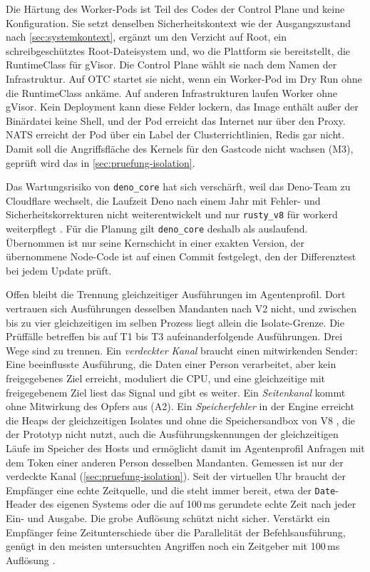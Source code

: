 Die Härtung des Worker-Pods ist Teil des Codes der Control Plane und keine Konfiguration. Sie setzt denselben
Sicherheitskontext wie der Ausgangszustand nach \autoref{sec:systemkontext}, ergänzt um den Verzicht auf Root, ein
schreibgeschütztes Root-Dateisystem und, wo die Plattform sie bereitstellt, die RuntimeClass für gVisor. Die Control
Plane wählt sie nach dem Namen der Infrastruktur. Auf \ac{OTC} startet sie nicht, wenn ein Worker-Pod im Dry Run ohne die
RuntimeClass ankäme. Auf anderen Infrastrukturen laufen Worker ohne gVisor. Kein Deployment
kann diese Felder lockern, das Image enthält außer der Binärdatei keine Shell, und der Pod erreicht das Internet nur über
den Proxy. NATS erreicht der Pod über ein Label der Clusterrichtlinien,
Redis gar nicht. Damit soll die Angriffsfläche des Kernels für den Gastcode nicht wachsen (M3), geprüft wird das in
\autoref{sec:pruefung-isolation}.

Das Wartungsrisiko von \texttt{deno\_core} hat sich verschärft, weil das Deno-Team zu Cloudflare wechselt, die Laufzeit Deno nach einem Jahr mit Fehler- und Sicherheitskorrekturen nicht weiterentwickelt und nur \texttt{rusty\_v8} für workerd weiterpflegt \autocite{noauthor_deno_2026}. Für die Planung gilt \texttt{deno\_core}
deshalb als auslaufend. Übernommen ist nur seine Kernschicht in einer
exakten Version, der übernommene Node-Code ist auf einen Commit festgelegt, den der Differenztest bei jedem Update
prüft.

Offen bleibt die Trennung gleichzeitiger Ausführungen im Agentenprofil. Dort vertrauen sich Ausführungen
desselben Mandanten nach V2 nicht, und zwischen bis zu vier gleichzeitigen im selben Prozess liegt allein die
Isolate-Grenze. Die Prüffälle betreffen bis auf T1 bis T3 aufeinanderfolgende Ausführungen. Drei Wege sind zu trennen. Ein
\emph{verdeckter Kanal} braucht einen mitwirkenden Sender: Eine beeinflusste Ausführung, die Daten einer Person
verarbeitet, aber kein freigegebenes Ziel erreicht, moduliert die \ac{CPU}, und eine gleichzeitige mit freigegebenem
Ziel liest das Signal und gibt es weiter. Ein \emph{Seitenkanal} kommt ohne Mitwirkung des Opfers aus (A2). Ein
\emph{Speicherfehler} in der Engine erreicht die Heaps der gleichzeitigen Isolates und ohne die Speichersandbox von V8
\autocite{gross_v8_2024}, die der Prototyp nicht nutzt, auch die Ausführungskennungen der gleichzeitigen Läufe im Speicher des Hosts und ermöglicht damit im
Agentenprofil Anfragen mit dem Token einer anderen Person desselben Mandanten. Gemessen ist nur der verdeckte Kanal (\autoref{sec:pruefung-isolation}).
Seit der virtuellen Uhr braucht der Empfänger eine echte Zeitquelle, und die steht immer bereit, etwa der
\texttt{Date}-Header des eigenen Systems oder die auf 100\,ms gerundete echte Zeit nach jeder Ein- und Ausgabe. Die
grobe Auflösung schützt nicht sicher. Verstärkt ein Empfänger feine Zeitunterschiede über die Parallelität der
Befehlsausführung, genügt in den meisten untersuchten Angriffen noch ein Zeitgeber mit 100\,ms Auflösung
\autocite[S.~356]{xiao_hacky_2023}.

